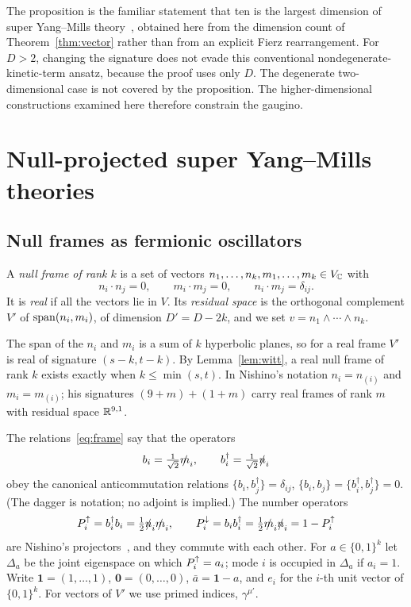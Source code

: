 The proposition is the familiar statement that ten is the largest dimension of super Yang--Mills theory~\cite{BrinkSchwarzScherk1977}, obtained here from the dimension count of Theorem~\ref{thm:vector} rather than from an explicit Fierz rearrangement. For $D>2$, changing the signature does not evade this conventional nondegenerate-kinetic-term ansatz, because the proof uses only $D$. The degenerate two-dimensional case is not covered by the proposition. The higher-dimensional constructions examined here therefore constrain the gaugino.

\section{Null-projected super Yang--Mills theories}
\label{sec:null}

\subsection{Null frames as fermionic oscillators}

\begin{definition}
\label{def:frame}
A \emph{null frame of rank $k$} is a set of vectors $n_1,\dots,n_k,\allowbreak m_1,\dots,m_k\in V_{\mathbb{C}}$ with
\begin{equation}
\label{eq:frame}
n_i\cdot n_j=0,\qquad m_i\cdot m_j=0,\qquad n_i\cdot m_j=\delta_{ij}.
\end{equation}
It is \emph{real} if all the vectors lie in $V$. Its \emph{residual space} is the orthogonal complement $V'$ of $\operatorname{span}(n_i,m_i)$, of dimension $D'=D-2k$, and we set $v=n_1\wedge\cdots\wedge n_k$.
\end{definition}

The span of the $n_i$ and $m_i$ is a sum of $k$ hyperbolic planes, so for a real frame $V'$ is real of signature $(s-k,t-k)$. By Lemma~\ref{lem:witt}, a real null frame of rank $k$ exists exactly when $k\le\min(s,t)$. In Nishino's notation $n_i=n_{(i)}$ and $m_i=m_{(i)}$; his signatures $(9+m)+(1+m)$ carry real frames of rank $m$ with residual space $\mathbb{R}^{9,1}$.

The relations~\eqref{eq:frame} say that the operators
\begin{equation}
\label{eq:osc}
b_i=\tfrac{1}{\sqrt2}\slashed{m}_i,\qquad b_i^\dagger=\tfrac{1}{\sqrt2}\slashed{n}_i
\end{equation}
obey the canonical anticommutation relations $\{b_i,b_j^\dagger\}=\delta_{ij}$, $\{b_i,b_j\}=\{b_i^\dagger,b_j^\dagger\}=0$. (The dagger is notation; no adjoint is implied.) The number operators
\begin{equation}
\label{eq:proj}
P^{\uparrow}_i=b_i^\dagger b_i=\tfrac12\slashed{n}_i\slashed{m}_i,\qquad P^{\downarrow}_i=b_ib_i^\dagger=\tfrac12\slashed{m}_i\slashed{n}_i=1-P^{\uparrow}_i
\end{equation}
are Nishino's projectors~\cite{Nishino1998}, and they commute with each other. For $a\in\{0,1\}^k$ let $\Delta_a$ be the joint eigenspace on which $P^{\uparrow}_i=a_i$; mode $i$ is occupied in $\Delta_a$ if $a_i=1$. Write $\mathbf 1=(1,\dots,1)$, $\mathbf 0=(0,\dots,0)$, $\bar a=\mathbf 1-a$, and $e_i$ for the $i$-th unit vector of $\{0,1\}^k$. For vectors of $V'$ we use primed indices, $\gamma^{\mu'}$.

